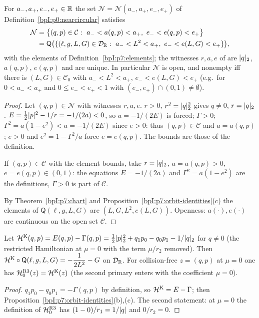 \begin{lemma}\label{bpI:p7:near-circular}
For $a_-,a_+,e_-,e_+\in\mathbb{R}$ the set $\mathcal N=\mathcal N(a_-,a_+,e_-,e_+)$ of Definition~\ref{bpI:p0:nearcircular} satisfies
\begin{align*}
\mathcal N&=\bigl\{(q,p)\in\mathcal C:\ a_-<a(q,p)<a_+,\ e_-<e(q,p)<e_+\bigr\}\\
&=\mathsf Q\bigl(\{(\ell,g,L,G)\in\mathcal D_\R:\ a_-<L^2<a_+,\ e_-<e(L,G)<e_+\}\bigr),
\end{align*}
with the elements of Definition~\ref{bpI:p7:elements}; the witnesses $r,a,e$ of  are $\lvert q\rvert_2$, $a(q,p)$, $e(q,p)$ and are unique. In particular $\mathcal N$ is open, and nonempty iff there is $(L,G)\in\mathcal C_0$ with $a_-<L^2<a_+$, $e_-<e(L,G)<e_+$ (e.g.\ for $0<a_-<a_+$ and $0\le e_-<e_+<1$ with $(e_-,e_+)\cap(0,1)\ne\emptyset$).
\end{lemma}
\begin{proof}
\proofstep{$\subseteq$}\label{stepI:p7:nc-sub} Let $(q,p)\in\mathcal N$ with witnesses $r,a,e$. $r>0$, $r^2=\lvert q\rvert_2^2$ gives $q\ne0$, $r=\lvert q\rvert_2$. $E=\tfrac12\lvert p\rvert^2-1/r=-1/(2a)<0$, so $a=-1/(2E)$ is forced; $\Gamma>0$; $\Gamma^2=a(1-e^2)<a=-1/(2E)$ since $e>0$: thus $(q,p)\in\mathcal C$ and $a=a(q,p)$; $e>0$ and $e^2=1-\Gamma^2/a$ force $e=e(q,p)$. The bounds are those of the definition.

\proofstep{$\supseteq$}\label{stepI:p7:nc-sup} If $(q,p)\in\mathcal C$ with the element bounds, take $r=\lvert q\rvert_2$, $a=a(q,p)>0$, $e=e(q,p)\in(0,1)$: the equations $E=-1/(2a)$ and $\Gamma^2=a(1-e^2)$ are the definitions, $\Gamma>0$ is part of $\mathcal C$.

\label{stepI:p7:nc-image} By Theorem~\ref{bpI:p7:chart} and Proposition~\ref{bpI:p7:orbit-identities}(c) the elements of $\mathsf Q(\ell,g,L,G)$ are $(L,G,L^2,e(L,G))$. Openness: $a(\cdot),e(\cdot)$ are continuous on the open set $\mathcal C$.
\end{proof}

\begin{lemma}\label{bpI:p7:h0}
Let $\mathcal H^{\rm K}(q,p)=E(q,p)-\Gamma(q,p)=\tfrac12\lvert p\rvert_2^2+q_1p_0-q_0p_1-1/\lvert q\rvert_2$ for $q\ne0$ (the restricted Hamiltonian at $\mu=0$ with the term $\mu/r_2$ removed). Then
$\mathcal H^{\rm K}\circ\mathsf Q(\ell,g,L,G)=-\dfrac1{2L^2}-G$ on $\mathcal D_{\mathbb{R}}$. For collision-free $z=(q,p)$ at $\mu=0$ one has $\mathcal H^{\rm R3}_0(z)=\mathcal H^{\rm K}(z)$ (the second primary enters with the coefficient $\mu=0$).
\end{lemma}
\begin{proof}
\label{stepI:p7:h0-formula} $q_1p_0-q_0p_1=-\Gamma(q,p)$ by definition, so $\mathcal H^{\rm K}=E-\Gamma$; then Proposition~\ref{bpI:p7:orbit-identities}(b),(c). The second statement: at $\mu=0$ the definition of $\mathcal H^{\rm R3}_0$ has $(1-0)/r_1=1/\lvert q\rvert$ and $0/r_2=0$.
\end{proof}

